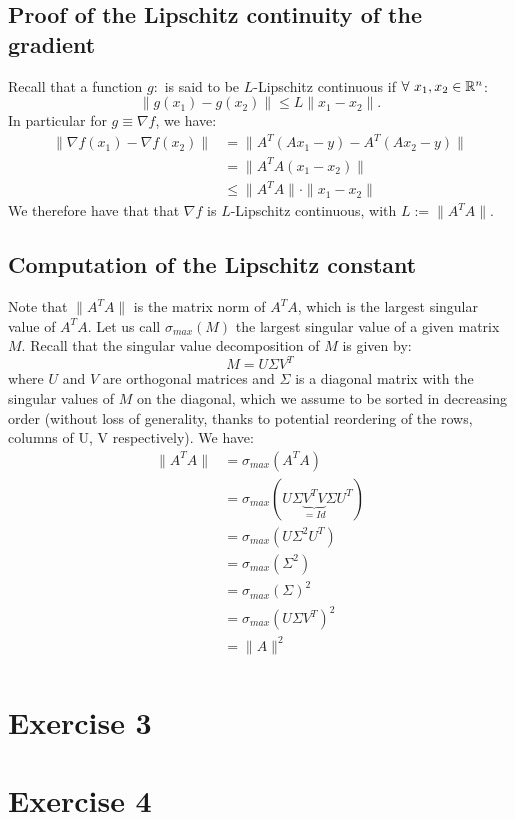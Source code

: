 \documentclass[12pt]{article}
\begin{document}
\subsection{Proof of the Lipschitz continuity of the gradient}
Recall that a function $g: $ is said to be $L$-Lipschitz continuous if $\forall\ x_1, x_2 \in \mathbb{R}^n$:
\begin{equation}
  \|g(x_1) - g(x_2)\| \leq L \|x_1 - x_2\|.
\end{equation}
In particular for $g \equiv \nabla f$, we have:
\begin{align*}
  \| \nabla f (x_1) - \nabla f (x_2) \|
   & = \| A^T(Ax_1 - y) - A^T(Ax_2 - y) \|  \\
   & = \| A^T A(x_1 - x_2) \|               \\
   & \leq \| A^T A \| \cdot \| x_1 - x_2 \|
\end{align*}
We therefore have that that $\nabla f$ is $L$-Lipschitz continuous, with $L := \| A^T A \|$.

\subsection{Computation of the Lipschitz constant}
Note that $\| A^T A \|$ is the matrix norm of $A^T A$, which is the largest singular value of $A^T A$. Let us call $\sigma_{max}(M)$ the largest singular value of a given matrix $M$. Recall that the singular value decomposition of $M$ is given by:
\begin{equation}
  M = U \Sigma V^T
\end{equation}
where $U$ and $V$ are orthogonal matrices and $\Sigma$ is a diagonal matrix with the singular values of $M$ on the diagonal, which we assume to be sorted in decreasing order (without loss of generality, thanks to potential reordering of the rows, columns of U, V respectively). We have:
\begin{align*}
  \| A^T A \|
   & = \sigma_{max}(A^T A)                                        \\
   & = \sigma_{max}(U \Sigma \underbrace{V^T V}_{=Id} \Sigma U^T) \\
   & = \sigma_{max}(U \Sigma^2 U^T)                               \\
   & = \sigma_{max}(\Sigma^2)                                     \\
   & = \sigma_{max}(\Sigma)^2                                     \\
   & = \sigma_{max}(U \Sigma V^T)^2                               \\
   & = \| A \| ^2                                                 \\
\end{align*}





\section{Exercise 3}
\section{Exercise 4}


\end{document}
